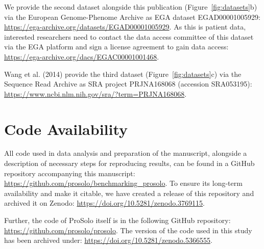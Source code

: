 \documentclass[12pt,inline]{wlscirep}
\begin{document}
We provide the second dataset alongside this publication (Figure~\ref{fig:datasets}b) via the European Genome-Phenome Archive as EGA dataset \mbox{EGAD00001005929}: \url{https://ega-archive.org/datasets/EGAD00001005929}.
As this is patient data, interested researchers need to contact the data access committee of this dataset via the EGA platform and sign a license agreement to gain data access: \url{https://ega-archive.org/dacs/EGAC00001001468}.

Wang et al. (2014)\cite{wang_clonal_2014} provide the third dataset (Figure~\ref{fig:datasets}c) via the Sequence Read Archive as SRA project \mbox{PRJNA168068} (accession \mbox{SRA053195}): \url{https://www.ncbi.nlm.nih.gov/sra/?term=PRJNA168068}.



\section*{Code Availability}

All code used in data analysis and preparation of the manuscript, alongside a description of necessary steps for reproducing results, can be found in a GitHub repository accompanying this manuscript: \url{https://github.com/prosolo/benchmarking_prosolo}.
To ensure its long-term availability and make it citable, we have created a release of this repository and archived it on Zenodo: \url{https://doi.org/10.5281/zenodo.3769115}.

Further, the code of ProSolo itself is in the following GitHub repository: \url{https://github.com/prosolo/prosolo}.
The version of the code used in this study has been archived under: \url{https://doi.org/10.5281/zenodo.5366555}.
\end{document}
